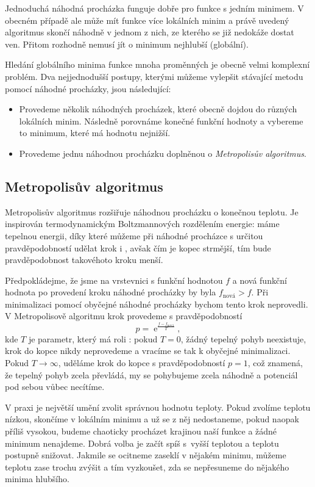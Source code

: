 \documentclass[a4paper,11pt,twoside]{article}
\DeclareMathOperator{\e}{e}             %
\theoremstyle{red}
\theoremstyle{green}
\begin{document}
    Jednoduchá náhodná procházka funguje dobře pro funkce s jedním minimem.
    V obecném případě ale může mít funkce více lokálních minim a právě uvedený algoritmus skončí náhodně v jednom z nich, ze kterého se již nedokáže dostat ven.
    Přitom rozhodně nemusí jít o minimum nejhlubší (globální).
    
    Hledání globálního minima funkce mnoha proměnných je obecně velmi komplexní problém.
    Dva nejjednodušší postupy, kterými můžeme vylepšit stávající metodu pomocí náhodné procházky, jsou následující:
    \begin{itemize}
        \item Provedeme několik náhodných procházek, které obecně dojdou do různých lokálních minim.
            Následně porovnáme konečné funkční hodnoty a vybereme to minimum, které má hodnotu nejnižší.
        \item Provedeme jednu náhodnou procházku doplněnou o \emph{Metropolisův algoritmus}. 
    \end{itemize}

\subsection{Metropolisův algoritmus}
    Metropolisův algoritmus rozšiřuje náhodnou procházku o konečnou teplotu.
    Je inspirován termodynamickým Boltzmannových rozdělením energie: 
    máme tepelnou energii, díky které můžeme při náhodné procházce s určitou pravděpodobností udělat krok i , avšak čím je kopec strmější, tím bude pravděpodobnost takovéhoto kroku menší.
    
    Předpokládejme, že jsme na vrstevnici s funkční hodnotou $f$ a nová funkční hodnota po provedení kroku náhodné procházky by byla $f_{\text{nová}}>f$.
    Při minimalizaci pomocí obyčejné náhodné procházky bychom tento krok neprovedli.
    V Metropolisově algoritmu krok provedeme s pravděpodobností
    \begin{equation}
        p=\e^{\frac{f-f_{\text{nová}}}{T}},
    \end{equation}
    kde $T$ je parametr, který má roli : pokud $T=0$, žádný tepelný pohyb neexistuje, krok do kopce nikdy neprovedeme a vracíme se tak k obyčejné minimalizaci.
    Pokud $T\rightarrow\infty$, uděláme krok do kopce s pravděpodobností $p=1$,
    což znamená, že tepelný pohyb zcela převládá, my se pohybujeme zcela náhodně a potenciál pod sebou vůbec necítíme.
    
    V praxi je největší umění zvolit správnou hodnotu teploty.
    Pokud zvolíme teplotu nízkou, skončíme v lokálním minimu a už se z něj nedostaneme, pokud naopak příliš vysokou, budeme chaoticky procházet krajinou naší funkce a žádné minimum nenajdeme.
    Dobrá volba je začít spíš s~vyšší teplotou a teplotu postupně snižovat.
    Jakmile se ocitneme zaseklí v nějakém minimu, můžeme teplotu zase trochu zvýšit a tím vyzkoušet, zda se nepřesuneme do nějakého minima hlubšího.
\end{document}
